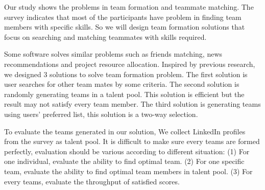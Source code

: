 \documentclass[conference]{IEEEtran}
\begin{document}
Our study shows the problems in team formation and teammate matching. The survey indicates that most of the participants have problem in finding team members with specific skills. So we will design team formation solutions that focus on searching and matching teammates with skills required. 

Some software solves similar problems such as friends matching, news recommendations and project resource allocation. Inspired by previous research, we designed 3 solutions to solve team formation problem. The first solution is user searches for other team mates by some criteria. The second solution is randomly generating teams in a talent pool. This solution is efficient but the result may not satisfy every team member. The third solution is generating teams using users' preferred list, this solution is a two-way selection.

To evaluate the teams generated in our solution, We collect LinkedIn profiles from the survey as talent pool. It is difficult to make sure every teams are formed perfectly, evaluation should be various according to different situation:
(1) For one individual, evaluate the ability to find optimal team.
(2) For one specific team, evaluate the ability to find optimal team members in talent pool.
(3) For every teams, evaluate the throughput of satisfied scores.









\end{document}
